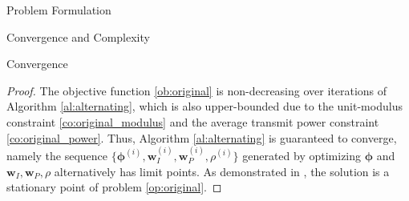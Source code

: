 \documentclass[journal]{IEEEtran}
\begin{document}
\begin{section}{Problem Formulation}
\begin{subsection}{Convergence and Complexity}
\begin{subsubsection}{Convergence}
			\begin{proof}\label{pf:ao}
				The objective function \ref{ob:original} is non-decreasing over iterations of Algorithm \ref{al:alternating}, which is also upper-bounded due to the unit-modulus constraint \ref{co:original_modulus} and the average transmit power constraint \ref{co:original_power}. Thus, Algorithm \ref{al:alternating} is guaranteed to converge, namely the sequence $\{\boldsymbol{\phi}^{(i)},\boldsymbol{w}_I^{(i)},\boldsymbol{w}_P^{(i)},\rho^{(i)}\}$ generated by optimizing $\boldsymbol{\phi}$ and $\boldsymbol{w}_I,\boldsymbol{w}_P,\rho$ alternatively has limit points. As demonstrated in \cite{Grippo2000,Hong2016,Li2013a}, the solution is a stationary point of problem \ref{op:original}.
			\end{proof}
		\end{subsubsection}
	\end{subsection}
\end{section}
\end{document}
